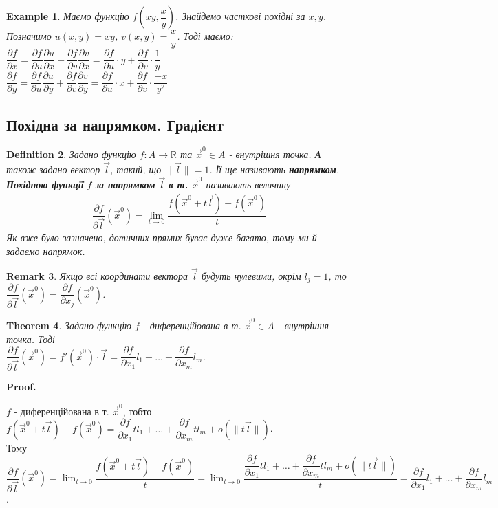 \documentclass[a4paper, 10pt]{article}
\makeatletter
\def\departial#1#2{\dfrac{\partial {#1}}{\partial {#2}}}
\def\huge{\displaystyle}
\def\qed{$\blacksquare$}
\theoremstyle{theoremdd}
\newtheorem{theorem}{Theorem}[subsection]
\theoremstyle{theoremdd}
\newtheorem{definition}[theorem]{Definition}
\theoremstyle{theoremdd}
\theoremstyle{theoremdd}
\newtheorem{example}[theorem]{Example}
\theoremstyle{theoremdd}
\theoremstyle{theoremdd}
\newtheorem{remark}[theorem]{Remark}
\theoremstyle{theoremdd}
\theoremstyle{theoremdd}
\renewenvironment{proof}[1][Proof.\\]{\par
\pushQED{\hfill \qed}%
\normalfont \topsep6\p@\@plus6\p@\relax
\trivlist
\item\relax
{\bfseries
#1\@addpunct{.}}\hspace\labelsep\ignorespaces
}{%
\popQED\endtrivlist\@endpefalse
}
\newcommand\Norm[1]{\lVert#1\rVert}
\makeatother
\begin{document}
\begin{example}
Маємо функцію $f\left( xy, \dfrac{x}{y} \right)$. Знайдемо часткові похідні за $x,y$.\\
Позначимо $u(x,y) = xy$, $v(x,y) = \dfrac{x}{y}$. Тоді маємо:\\
$\departial{f}{x} = \departial{f}{u} \departial{u}{x} + \departial{f}{v} \departial{v}{x} = \departial{f}{u} \cdot y + \departial{f}{v} \cdot \dfrac{1}{y}$\\
$\departial{f}{y} = \departial{f}{u} \departial{u}{y} + \departial{f}{v} \departial{v}{y} = \departial{f}{u} \cdot x + \departial{f}{v} \cdot \dfrac{-x}{y^2}$
\end{example}

\subsection{Похідна за напрямком. Градієнт}
\begin{definition}
Задано функцію $f: A \to \mathbb{R}$ та $\vec{x}^0 \in A$ - внутрішня точка. А також задано вектор $\vec{l}$, такий, що $\Norm{\vec{l}} = 1$. Її ще називають \textbf{напрямком}.\\
\textbf{Похідною функції} $f$ \textbf{за напрямком} $\vec{l}$ \textbf{в т. $\vec{x}^0$} називають величину
\begin{align*}
\dfrac{\partial f}{\partial \vec{l}} (\vec{x}^0) = \lim_{t \to 0} \dfrac{f(\vec{x}^0+t \vec{l}) - f(\vec{x}^0)}{t}
\end{align*}
Як вже було зазначено, дотичних прямих буває дуже багато, тому ми й задаємо напрямок.
\end{definition}

\begin{remark}
Якщо всі координати вектора $\vec{l}$ будуть нулевими, окрім $l_j = 1$, то $\dfrac{\partial f}{\partial \vec{l}} (\vec{x}^0) = \dfrac{\partial f}{\partial x_j} (\vec{x}^0)$.
\end{remark}

\begin{theorem}
Задано функцію $f$ - диференційована в т. $\vec{x}^0 \in A$ - внутрішня точка. Тоді\\
$\departial{f}{\vec{l}}(\vec{x}^0) = f'(\vec{x}^0) \cdot \vec{l} = \departial{f}{x_1} l_1 + \dots + \departial{f}{x_m} l_m$.
\end{theorem}

\begin{proof}
$f$ - диференційована в т. $\vec{x}^0$, тобто $f(\vec{x}^0 + t \vec{l}) - f(\vec{x}^0) = \departial{f}{x_1}tl_1 + \dots + \departial{f}{x_m}tl_m + o(\Norm{t\vec{l}})$.\\
Тому $\departial{f}{\vec{l}}(\vec{x}^0) = \huge\lim_{t \to 0} \dfrac{f(\vec{x}^0+t\vec{l}) - f(\vec{x}^0)}{t} = \lim_{t \to 0} \dfrac{\departial{f}{x_1}tl_1 + \dots + \departial{f}{x_m}tl_m + o(\Norm{t\vec{l}})}{t} = \departial{f}{x_1}l_1 + \dots + \departial{f}{x_m}l_m$.
\end{proof}
\end{document}
